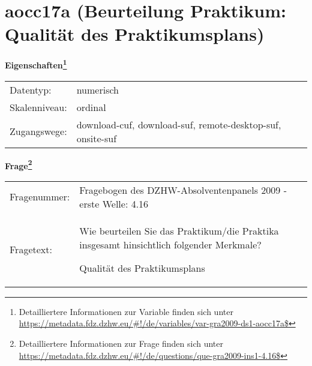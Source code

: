 
    \setcounter{footnote}{0}

    \vspace*{-1.8cm}
	\section{aocc17a (Beurteilung Praktikum: Qualität des Praktikumsplans)}
	\label{section:aocc17a}



    \vspace*{0.5cm}
    \noindent\textbf{Eigenschaften\footnote{Detailliertere Informationen zur Variable finden sich unter
		\url{https://metadata.fdz.dzhw.eu/\#!/de/variables/var-gra2009-ds1-aocc17a$}}}\\
	\begin{tabularx}{\hsize}{@{}lX}
	Datentyp: & numerisch \\
	Skalenniveau: & ordinal \\
	Zugangswege: &
	  download-cuf, 
	  download-suf, 
	  remote-desktop-suf, 
	  onsite-suf
 \\
    \end{tabularx}



				\vspace*{0.5cm}
                \noindent\textbf{Frage\footnote{Detailliertere Informationen zur Frage finden sich unter
		              \url{https://metadata.fdz.dzhw.eu/\#!/de/questions/que-gra2009-ins1-4.16$}}}\\
				\begin{tabularx}{\hsize}{@{}lX}
					Fragenummer: &
					  Fragebogen des DZHW-Absolventenpanels 2009 - erste Welle:
					  4.16
 \\
					Fragetext: & Wie beurteilen Sie das Praktikum/die Praktika insgesamt hinsichtlich folgender Merkmale?\par  Qualität des Praktikumsplans \\
				\end{tabularx}





